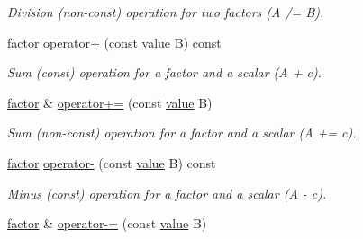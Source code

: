 \begin{DoxyCompactItemize}
\begin{DoxyCompactList}\small\item\em Division (non-\/const) operation for two factors (A /= B). \end{DoxyCompactList}\item 
\hyperlink{classmerlin_1_1factor}{factor} \hyperlink{classmerlin_1_1factor_a511ab1230070c551f3df9bfbb0ccd271}{operator+} (const \hyperlink{classmerlin_1_1factor_a1b14d19e509403448fbef26b003c9281}{value} B) const \hypertarget{classmerlin_1_1factor_a511ab1230070c551f3df9bfbb0ccd271}{}\label{classmerlin_1_1factor_a511ab1230070c551f3df9bfbb0ccd271}

\begin{DoxyCompactList}\small\item\em Sum (const) operation for a factor and a scalar (A + c). \end{DoxyCompactList}\item 
\hyperlink{classmerlin_1_1factor}{factor} \& \hyperlink{classmerlin_1_1factor_a21ca9eaf0481b37777d452ffdd19a377}{operator+=} (const \hyperlink{classmerlin_1_1factor_a1b14d19e509403448fbef26b003c9281}{value} B)\hypertarget{classmerlin_1_1factor_a21ca9eaf0481b37777d452ffdd19a377}{}\label{classmerlin_1_1factor_a21ca9eaf0481b37777d452ffdd19a377}

\begin{DoxyCompactList}\small\item\em Sum (non-\/const) operation for a factor and a scalar (A += c). \end{DoxyCompactList}\item 
\hyperlink{classmerlin_1_1factor}{factor} \hyperlink{classmerlin_1_1factor_ace6b3213cbafbf6f08a1a6da9a80a9f4}{operator-\/} (const \hyperlink{classmerlin_1_1factor_a1b14d19e509403448fbef26b003c9281}{value} B) const \hypertarget{classmerlin_1_1factor_ace6b3213cbafbf6f08a1a6da9a80a9f4}{}\label{classmerlin_1_1factor_ace6b3213cbafbf6f08a1a6da9a80a9f4}

\begin{DoxyCompactList}\small\item\em Minus (const) operation for a factor and a scalar (A -\/ c). \end{DoxyCompactList}\item 
\hyperlink{classmerlin_1_1factor}{factor} \& \hyperlink{classmerlin_1_1factor_ab2356cf9170a9ce9b36fd2cdbb9cd1cd}{operator-\/=} (const \hyperlink{classmerlin_1_1factor_a1b14d19e509403448fbef26b003c9281}{value} B)\hypertarget{classmerlin_1_1factor_ab2356cf9170a9ce9b36fd2cdbb9cd1cd}{}\label{classmerlin_1_1factor_ab2356cf9170a9ce9b36fd2cdbb9cd1cd}


\end{DoxyCompactItemize}
